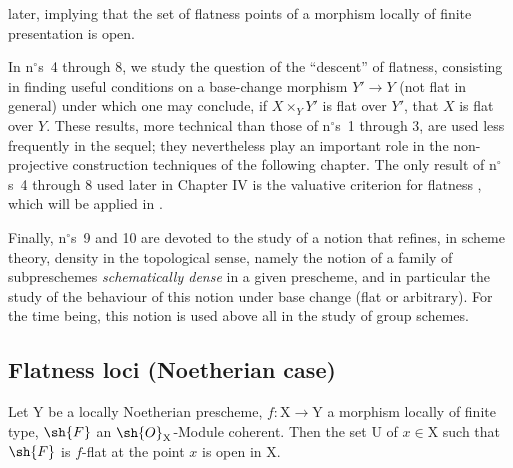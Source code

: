 later, implying that the set of flatness points of a morphism locally of finite
presentation is open.

In n$^\circ$s~4 through 8, we study the question of the ``descent'' of
flatness, consisting in finding useful conditions on a base-change morphism
$Y'\to Y$ (not flat in general) under which one may conclude, if
$X\times_YY'$ is flat over $Y'$, that $X$ is flat over $Y$. These results,
more technical than those of n$^\circ$s~1 through 3, are used less frequently
in the sequel; they nevertheless play an important role in the non-projective
construction techniques of the following chapter. The only result of
n$^\circ$s~4 through 8 used later in Chapter IV is the valuative criterion for
flatness , which will be applied in .

Finally, n$^\circ$s~9 and 10 are devoted to the study of a notion that refines,
in scheme theory, density in the topological sense, namely the notion of a
family of subpreschemes \emph{schematically dense} in a given prescheme, and
in particular the study of the behaviour of this notion under base change
(flat or arbitrary). For the time being, this notion is used above all in the
study of group schemes.


\subsection{Flatness loci (Noetherian case)}
\label{subsection:IV.11.1}

\begin{theorem}[11.1.1]
\label{IV.11.1.1}
Let $\mathrm{Y}$ be a locally Noetherian prescheme, $f:\mathrm{X}\to\mathrm{Y}$ a morphism locally of finite type, $\sh{F}$ an $\sh{O}_\mathrm{X}$-Module coherent. Then the set $\mathrm{U}$ of $x\in\mathrm{X}$ such that $\sh{F}$ is $f$-flat at the point $x$ is open in $\mathrm{X}$.
\end{theorem}

